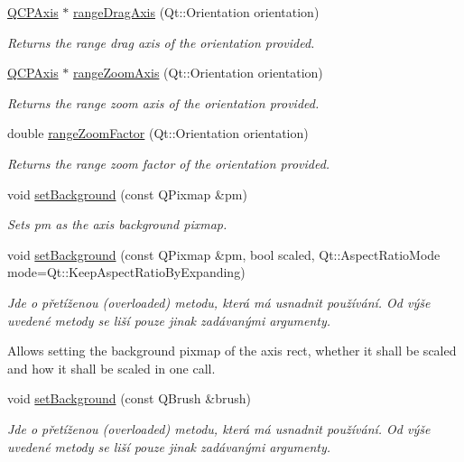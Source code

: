 \begin{DoxyCompactItemize}
\item 
\hyperlink{classQCPAxis}{Q\+C\+P\+Axis} $\ast$ \hyperlink{classQCPAxisRect_a6d7c22cfc54fac7a3d6ef80b133a8574}{range\+Drag\+Axis} (Qt\+::\+Orientation orientation)
\begin{DoxyCompactList}\small\item\em Returns the range drag axis of the {\itshape orientation} provided. \end{DoxyCompactList}\item 
\hyperlink{classQCPAxis}{Q\+C\+P\+Axis} $\ast$ \hyperlink{classQCPAxisRect_a679c63f2b8daccfe6ec5110dce3dd3b6}{range\+Zoom\+Axis} (Qt\+::\+Orientation orientation)
\begin{DoxyCompactList}\small\item\em Returns the range zoom axis of the {\itshape orientation} provided. \end{DoxyCompactList}\item 
double \hyperlink{classQCPAxisRect_ae4e6c4d143aacc88d2d3c56f117c2fe1}{range\+Zoom\+Factor} (Qt\+::\+Orientation orientation)
\begin{DoxyCompactList}\small\item\em Returns the range zoom factor of the {\itshape orientation} provided. \end{DoxyCompactList}\item 
void \hyperlink{classQCPAxisRect_af615ab5e52b8e0a9a0eff415b6559db5}{set\+Background} (const Q\+Pixmap \&pm)
\begin{DoxyCompactList}\small\item\em Sets {\itshape pm} as the axis background pixmap. \end{DoxyCompactList}\item 
void \hyperlink{classQCPAxisRect_ac48a2d5d9b7732e73b86605c69c5e4c1}{set\+Background} (const Q\+Pixmap \&pm, bool scaled, Qt\+::\+Aspect\+Ratio\+Mode mode=Qt\+::\+Keep\+Aspect\+Ratio\+By\+Expanding)
\begin{DoxyCompactList}\small\item\em Jde o přetíženou (overloaded) metodu, která má usnadnit používání. Od výše uvedené metody se liší pouze jinak zadávanými argumenty.

Allows setting the background pixmap of the axis rect, whether it shall be scaled and how it shall be scaled in one call. \end{DoxyCompactList}\item 
void \hyperlink{classQCPAxisRect_a22a22b8668735438dc06f9a55fe46b33}{set\+Background} (const Q\+Brush \&brush)
\begin{DoxyCompactList}\small\item\em Jde o přetíženou (overloaded) metodu, která má usnadnit používání. Od výše uvedené metody se liší pouze jinak zadávanými argumenty.


\end{DoxyCompactList}
\end{DoxyCompactItemize}
